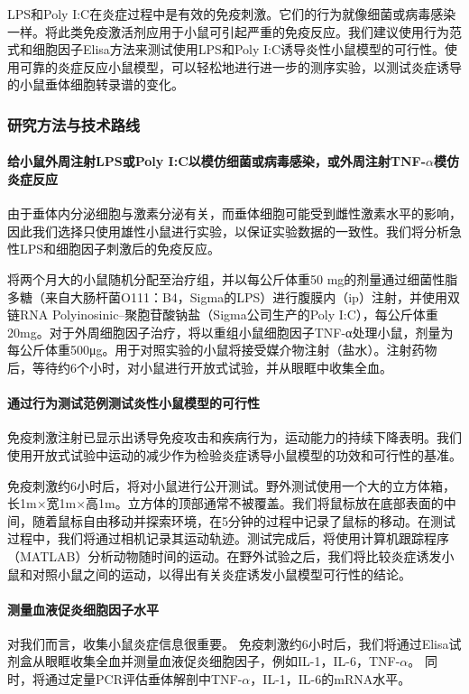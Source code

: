 \documentclass[class = opening]{whuthesis}
\begin{document}
  LPS和Poly I:C在炎症过程中是有效的免疫刺激。它们的行为就像细菌或病毒感染一样。将此类免疫激活剂应用于小鼠可引起严重的免疫反应。我们建议使用行为范式和细胞因子Elisa方法来测试使用LPS和Poly I:C诱导炎性小鼠模型的可行性。使用可靠的炎症反应小鼠模型，可以轻松地进行进一步的测序实验，以测试炎症诱导的小鼠垂体细胞转录谱的变化。
\subsubsection{研究方法与技术路线}
\paragraph{给小鼠外周注射LPS或Poly I:C以模仿细菌或病毒感染，或外周注射TNF-$\alpha$模仿炎症反应}
  由于垂体内分泌细胞与激素分泌有关，而垂体细胞可能受到雌性激素水平的影响，因此我们选择只使用雄性小鼠进行实验，以保证实验数据的一致性。我们将分析急性LPS和细胞因子刺激后的免疫反应。

  将两个月大的小鼠随机分配至治疗组，并以每公斤体重50 mg的剂量通过细菌性脂多糖（来自大肠杆菌O111：B4，Sigma的LPS）进行腹膜内（ip）注射，并使用双链RNA Polyinosinic–聚胞苷酸钠盐（Sigma公司生产的Poly I:C），每公斤体重20mg。对于外周细胞因子治疗，将以重组小鼠细胞因子TNF-α处理小鼠，剂量为每公斤体重500μg。用于对照实验的小鼠将接受媒介物注射（盐水）。注射药物后，等待约6个小时，对小鼠进行开放式试验，并从眼眶中收集全血。
\paragraph{通过行为测试范例测试炎性小鼠模型的可行性}
  免疫刺激注射已显示出诱导免疫攻击和疾病行为，运动能力的持续下降表明。我们使用开放式试验中运动的减少作为检验炎症诱导小鼠模型的功效和可行性的基准。

  免疫刺激约6小时后，将对小鼠进行公开测试。野外测试使用一个大的立方体箱，长1m×宽1m×高1m。立方体的顶部通常不被覆盖。我们将鼠标放在底部表面的中间，随着鼠标自由移动并探索环境，在5分钟的过程中记录了鼠标的移动。在测试过程中，我们将通过相机记录其运动轨迹。测试完成后，将使用计算机跟踪程序（MATLAB）分析动物随时间的运动。在野外试验之后，我们将比较炎症诱发小鼠和对照小鼠之间的运动，以得出有关炎症诱发小鼠模型可行性的结论。
\paragraph{测量血液促炎细胞因子水平}
  对我们而言，收集小鼠炎症信息很重要。 免疫刺激约6小时后，我们将通过Elisa试剂盒从眼眶收集全血并测量血液促炎细胞因子，例如IL-1，IL-6，TNF-$\alpha$。 同时，将通过定量PCR评估垂体解剖中TNF-$\alpha$，IL-1，IL-6的mRNA水平。
\end{document}
